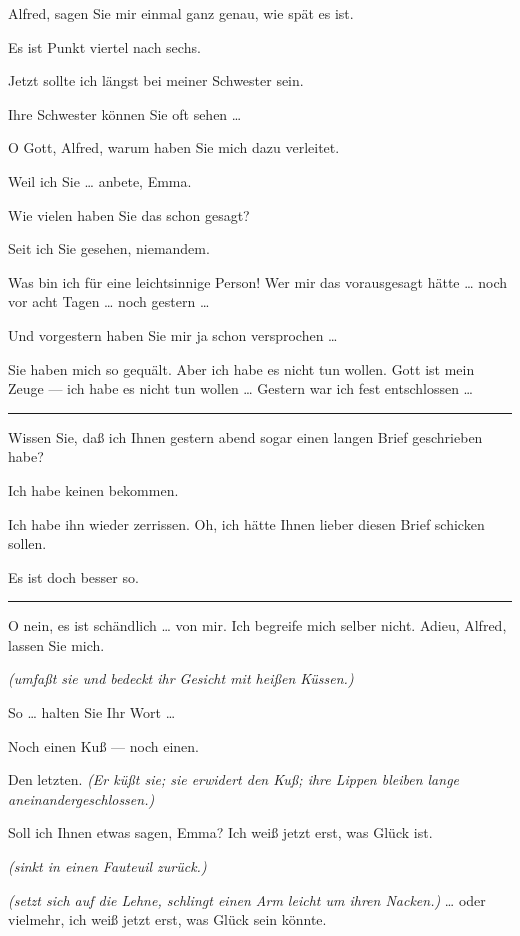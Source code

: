 \documentclass[
	final,
	a4paper,
	ngerman,
	mpinclude = true, %
	twoside = true,
	open = right,
	cleardoublepage = plain,
	DIV = 13,
	BCOR = 1cm,
	titlepage = firstiscover,
	]{scrbook}
\newcommand{\direction}[1]{\textit{(#1)}}
\newenvironment{deletion}{%
		\vspace{0.25\baselineskip}
		\hrule
		\vspace{0.25\baselineskip}
		\color{darkgray}
	}{
		\color{black}
		\vspace{0.25\baselineskip}
		\hrule 
		\vspace{0.25\baselineskip}
	}
\newcommand{\thecharacter}[1]{\textup{\textsc{#1}}\xspace}
\newcommand{\theherr}{\thecharacter{Benjamin}}
\newcommand{\thefrau}{\thecharacter{Emma}}
\newcommand{\character}[1]{\item[#1:]}
\newcommand{\herr}{\character{\theherr}}
\newcommand{\frau}{\character{\thefrau}}
\begin{document}
\begin{play}
	\frau
	Alfred, sagen Sie mir einmal ganz genau, wie spät es ist.

	\herr
	Es ist Punkt viertel nach sechs.

	\frau
	Jetzt sollte ich längst bei meiner Schwester sein.

	\herr
	Ihre Schwester können Sie oft sehen \ldots{}

	\frau
	O Gott, Alfred, warum haben Sie mich dazu verleitet.

	\herr
	Weil ich Sie \ldots{} anbete, Emma.

	\frau
	Wie vielen haben Sie das schon gesagt?

	\herr
	Seit ich Sie gesehen, niemandem.

	\frau
	Was bin ich für eine leichtsinnige Person! Wer mir das vorausgesagt hätte \ldots{} noch vor acht Tagen \ldots{} noch gestern \ldots{}

	\herr
	Und vorgestern haben Sie mir ja schon versprochen \ldots{}

	\frau
	Sie haben mich so gequält. Aber ich habe es nicht tun wollen. Gott ist mein Zeuge --- ich habe es nicht tun wollen \ldots{} Gestern war ich fest entschlossen \ldots{}

	\begin{deletion}
	Wissen Sie, daß ich Ihnen gestern abend sogar einen langen Brief geschrieben habe?

	\herr
	Ich habe keinen bekommen.

	\frau
	Ich habe ihn wieder zerrissen. Oh, ich hätte Ihnen lieber diesen Brief schicken sollen.

	\herr
	Es ist doch besser so.
	\end{deletion}

	\frau
	O nein, es ist schändlich \ldots{} von mir. Ich begreife mich selber nicht. Adieu, Alfred, lassen Sie mich.

	\herr
	\direction{umfaßt sie und bedeckt ihr Gesicht mit heißen Küssen.}

	\frau
	So \ldots{} halten Sie Ihr Wort \ldots{}

	\herr
	Noch einen Kuß --- noch einen.

	\frau
	Den letzten. \direction{Er küßt sie; sie erwidert den Kuß; ihre Lippen bleiben lange aneinandergeschlossen.}

	\herr
	Soll ich Ihnen etwas sagen, Emma? Ich weiß jetzt erst, was Glück ist.

	\frau
	\direction{sinkt in einen Fauteuil zurück.}

	\herr
	\direction{setzt sich auf die Lehne, schlingt einen Arm leicht um ihren Nacken.} \ldots{} oder vielmehr, ich weiß jetzt erst, was Glück sein könnte.


\end{play}
\end{document}
